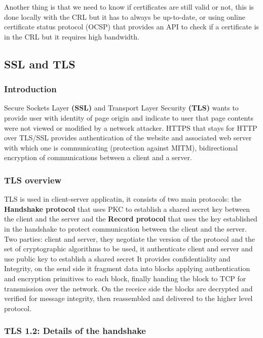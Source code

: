    Another thing is that we need to know if certificates are still valid or not, this is done locally with the CRL but it has to always be up-to-date, or using online certificate status protocol (OCSP) that provides an API to check if a certificate is in the CRL but it requires high bandwidth.
    
    \subsection{SSL and TLS}
    \subsubsection{Introduction}
    Secure Sockets Layer \textbf{(SSL)} and Transport Layer Security \textbf{(TLS)} wants to provide user with identity of page origin and indicate to user that page contents were not viewed or modified by a network attacker. HTTPS that stays for HTTP over TLS/SSL provides authentication of the website and associated web server with which one is communicating (protection against MITM), bidirectional encryption of communications between a client and a server.
    \subsubsection{TLS overview}
    TLS is used in client-server applicatin, it consists of two main protocols: the \textbf{Handshake protocol} that uses PKC to establish a shared secret key between the client and the server and the \textbf{Record protocol} that uses the key established in the handshake to protect communication between the client and the server.
    Two parties: client and server, they negotiate the version of the protocol and the set of cryptographic algorithms to be used, it authenticate client and server and use public key to establish a shared secret
    It provides confidentiality and Integrity, on the send side it fragment data into blocks applying authentication and encryption primitives to each block, finally handing the block to TCP for transmission over the network. On the receice side the blocks are decrypted and verified for message integrity, then reassembled and delivered to the higher level protocol.
    \subsubsection{TLS 1.2: Details of the handshake}
    
